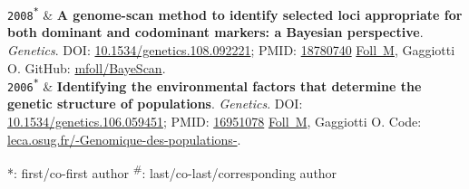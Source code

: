 \documentclass[10pt,a4paper]{article}
\newcommand{\LastName}{Foll}
\newcommand{\Initials}{M}
\newcommand{\Me}{\underline{\LastName\ \Initials}}  %
\newcommand{\Year}[1]{\fontsize{10pt}{0}\selectfont \texttt{#1}}
\newcommand{\DOI}[1]{DOI: \href{https://doi.org/#1}{#1}}
\newcommand{\PMID}[1]{PMID: \href{https://pubmed.ncbi.nlm.nih.gov/#1}{#1}}
\newcommand{\Website}[1]{\href{https://#1}{#1}}
\newcommand{\GitHub}[1]{GitHub: \href{https://github.com/#1}{#1}}
\begin{document}
\begin{EntriesTableYear}
 \Year{2008\textsuperscript{*}}  &
  \textbf{A genome-scan method to identify selected loci appropriate for both dominant and codominant markers: a Bayesian perspective}.
  \newline
  \textit{Genetics}.
  \DOI{10.1534/genetics.108.092221}; \PMID{18780740} 
  \newline
  \Me, Gaggiotti O.
  \newline
  \GitHub{mfoll/BayeScan}.
  \\

 \Year{2006\textsuperscript{*}}  &
  \textbf{Identifying the environmental factors that determine the genetic structure of populations}.
  \newline
  \textit{Genetics}.
  \DOI{10.1534/genetics.106.059451}; \PMID{16951078} 
  \newline
  \Me, Gaggiotti O.
  \newline
  Code: \Website{leca.osug.fr/-Genomique-des-populations-}. 
  \\

\end{EntriesTableYear}

*: first/co-first author
\newline
\textsuperscript{\#}: last/co-last/corresponding author
\end{document}
